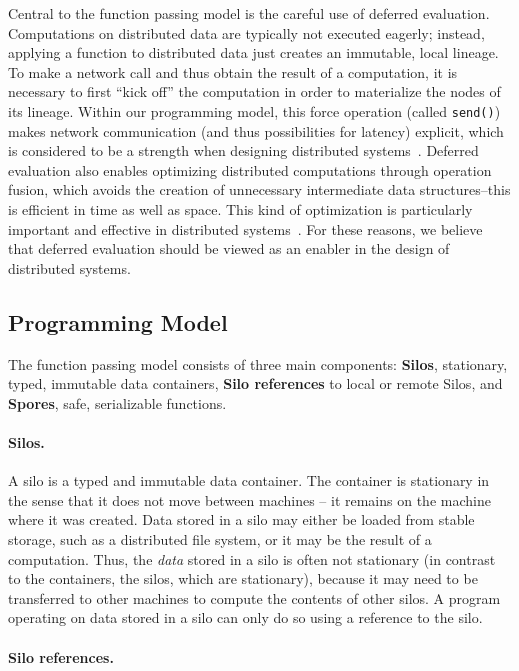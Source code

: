 \documentclass{jfp1}
\begin{document}
Central to the function passing model is the careful use of deferred evaluation.
Computations on distributed data are typically not executed eagerly; instead,
applying a function to distributed data just creates an immutable, local
lineage. To make a network call and thus obtain the result of a computation, it
is necessary to first ``kick off'' the computation in order to materialize the
nodes of its lineage. Within our programming model, this force operation (called
\verb|send()|) makes network communication (and thus possibilities for latency)
explicit, which is considered to be a strength when designing distributed
systems~\cite{ANoteDistComp}. Deferred evaluation also enables optimizing
distributed computations through operation fusion, which avoids the creation of
unnecessary intermediate data structures--this is efficient in time as well as
space. This kind of optimization is particularly important and effective in
distributed systems~\cite{FlumeJava}. For these reasons, we believe that
deferred evaluation should be viewed as an enabler in the design of distributed
systems.

\subsection{Programming Model}

The function passing model consists of three main components: \textbf{Silos},
stationary, typed, immutable data containers, \textbf{Silo references} to local
or remote Silos, and \textbf{Spores}, safe, serializable functions.

\paragraph{Silos.}

A silo is a typed and immutable data container. The container is
stationary in the sense that it does not move between machines -- it
remains on the machine where it was created. Data stored in a silo may
either be loaded from stable storage, such as a distributed file
system, or it may be the result of a computation. Thus, the {\em data}
stored in a silo is often not stationary (in contrast to the
containers, the silos, which are stationary), because it may need to
be transferred to other machines to compute the contents of other
silos. A program operating on data stored in a silo can only do so
using a reference to the silo.

\paragraph{Silo references.}
\end{document}
